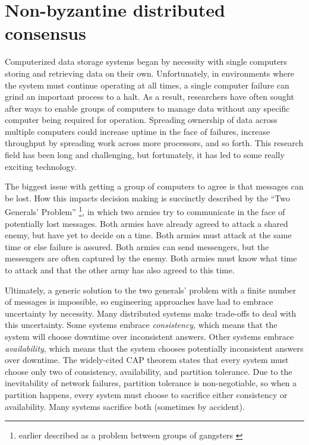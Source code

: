 \documentclass[11pt,fleqn,openany]{book}
\begin{document}
\section{Non-byzantine distributed consensus}

Computerized data storage systems began by necessity with single computers
storing and retrieving data on their own. Unfortunately, in environments where
the system must continue operating at all times, a single computer failure can
grind an important process to a halt. As a result, researchers have often
sought after ways to enable groups of computers to manage data
without any specific computer being required for operation. Spreading ownership
of data across multiple computers could increase uptime in the face of failures,
increase throughput by spreading work across more processors, and so forth.
This research field has been long and challenging, but fortunately, it has led
to some really exciting technology.

The biggest issue with getting a group of computers to agree is that messages
can be lost. How this impacts decision making is succinctly described by the
``Two Generals' Problem'' \cite{two-generals}
\footnote{earlier described as a problem
between groups of gangsters \cite{two-gangsters}}, in which two armies try to
communicate in the face of potentially lost messages. Both armies have already
agreed to attack a shared enemy, but have yet to decide on a time. Both armies
must attack at the same time or else failure is assured. Both armies can send
messengers, but the messengers are often captured by the enemy. Both armies must
know what time to attack and that the other army has also agreed to this time.

Ultimately, a generic solution to the two generals' problem with a finite number
of messages is impossible, so engineering approaches have had
to embrace uncertainty by necessity. Many distributed systems make trade-offs to
deal with this uncertainty. Some systems embrace {\em consistency}, which means
that the system will choose downtime over inconsistent answers. Other
systems embrace {\em availability}, which means that the system chooses
potentially inconsistent answers over downtime. The widely-cited CAP
theorem \cite{cap1, cap2} states that every system must choose only two of
consistency, availability, and partition tolerance.
Due to the inevitability of network
failures, partition tolerance is non-negotiable, so when a partition happens,
every system must choose to sacrifice either consistency or availability. Many
systems sacrifice both (sometimes by accident).
\end{document}
